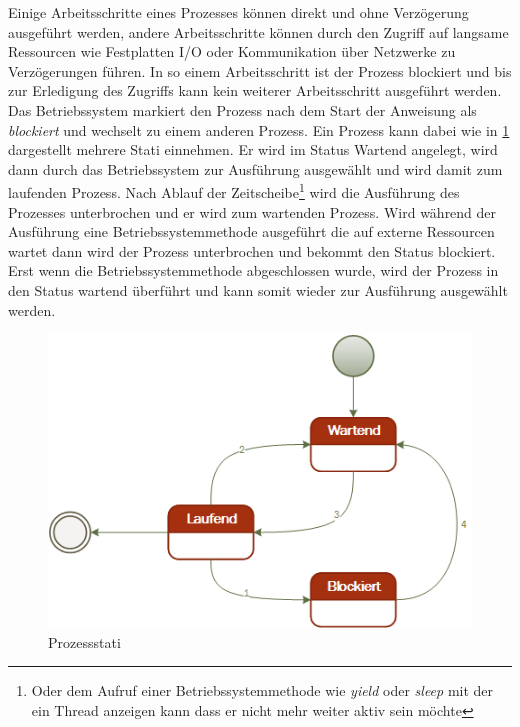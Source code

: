 Einige Arbeitsschritte eines Prozesses können direkt und ohne Verzögerung ausgeführt werden, andere Arbeitsschritte können durch den Zugriff auf langsame Ressourcen wie Festplatten I/O oder Kommunikation über Netzwerke zu Verzögerungen führen. In so einem Arbeitsschritt ist der Prozess blockiert und bis zur Erledigung des Zugriffs kann kein weiterer Arbeitsschritt ausgeführt werden. Das Betriebssystem markiert den Prozess nach dem Start der Anweisung als \emph{blockiert} und wechselt zu einem anderen Prozess. Ein Prozess kann dabei wie in \ref{fig:prozessstati} dargestellt mehrere Stati einnehmen. Er wird im Status Wartend angelegt, wird dann durch das Betriebssystem zur Ausführung ausgewählt und wird damit zum laufenden Prozess. Nach Ablauf der Zeitscheibe\footnote{Oder dem Aufruf einer Betriebssystemmethode wie \textit{yield} oder \textit{sleep} mit der ein Thread anzeigen kann dass er nicht mehr weiter aktiv sein möchte} wird die Ausführung des Prozesses unterbrochen und er wird zum wartenden Prozess. Wird während der Ausführung eine Betriebssystemmethode ausgeführt die auf externe Ressourcen wartet dann wird der Prozess unterbrochen und bekommt den Status blockiert. Erst wenn die Betriebssystemmethode abgeschlossen wurde, wird der Prozess in den Status wartend überführt und kann somit wieder zur Ausführung ausgewählt werden.

\begin{figure}
	\centering
	\includegraphics[width=0.7\linewidth]{images/pstates}
	\caption{Prozessstati\parencite[S. 134]{tanenbaum2016}\parencite[S. 152]{Dahlin2012}}
	\label{fig:prozessstati}
\end{figure}


